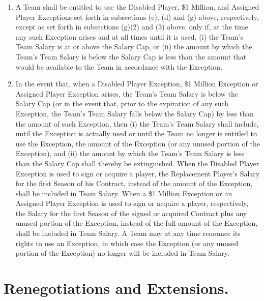 \documentclass[
]{book}
\providecommand{\tightlist}{%
  \setlength{\itemsep}{0pt}\setlength{\parskip}{0pt}}
\begin{document}
\begin{enumerate}
  \begin{enumerate}
  \def\labelenumii{(\arabic{enumii})}
  \tightlist
  \item
    A Team shall be entitled to use the Disabled Player, \$1 Million, and Assigned Player Exceptions set forth in subsections (c), (d) and (g) above, respectively, except as set forth in subsections (g)(2) and (3) above, only if, at the time any such Exception arises and at all times until it is used, (i) the Team's Team Salary is at or above the Salary Cap, or (ii) the amount by which the Team's Team Salary is below the Salary Cap is less than the amount that would be available to the Team in accordance with the Exception.
  \item
    In the event that, when a Disabled Player Exception, \$1 Million Exception or Assigned Player Exception arises, the Team's Team Salary is below the Salary Cap (or in the event that, prior to the expiration of any such Exception, the Team's Team Salary falls below the Salary Cap) by less than the amount of such Exception, then (i) the Team's Team Salary shall include, until the Exception is actually used or until the Team no longer is entitled to use the Exception, the amount of the Exception (or any unused portion of the Exception), and (ii) the amount by which the Team's Team Salary is less than the Salary Cap shall thereby be extinguished. When the Disabled Player Exception is used to sign or acquire a player, the Replacement Player's Salary for the first Season of his Contract, instead of the amount of the Exception, shall be included in Team Salary. When a \$1 Million Exception or an Assigned Player Exception is used to sign or acquire a player, respectively, the Salary for the first Season of the signed or acquired Contract plus any unused portion of the Exception, instead of the full amount of the Exception, shall be included in Team Salary. A Team may at any time renounce its rights to use an Exception, in which case the Exception (or any unused portion of the Exception) no longer will be included in Team Salary.
  \end{enumerate}
\end{enumerate}

\hypertarget{renegotiations-and-extensions.}{%
\section{Renegotiations and Extensions.}\label{renegotiations-and-extensions.}}
\end{document}
